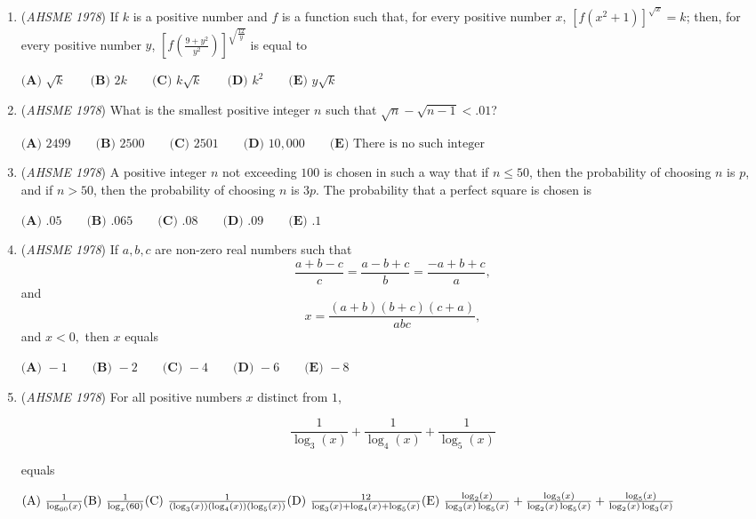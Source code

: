 \begin{enumerate}
 $\textbf{(A) }0\qquad \textbf{(B) }1\qquad \textbf{(C) }N-1\qquad \textbf{(D) }N\qquad  \textbf{(E) }\text{none of these}$


	\item (\textit{AHSME 1978}) If $k$ is a positive number and $f$ is a function such that, for every positive number $x$, $\left[f(x^2+1)\right]^{\sqrt{x}}=k$; 
then, for every positive number $y$, $\left[f(\frac{9+y^2}{y^2})\right]^{\sqrt{\frac{12}{y}}}$ is equal to


 $\textbf{(A) }\sqrt{k}\qquad \textbf{(B) }2k\qquad \textbf{(C) }k\sqrt{k}\qquad \textbf{(D) }k^2\qquad  \textbf{(E) }y\sqrt{k}$


	\item (\textit{AHSME 1978}) What is the smallest positive integer $n$ such that $\sqrt{n}-\sqrt{n-1}<.01$?


 $\textbf{(A) }2499\qquad \textbf{(B) }2500\qquad \textbf{(C) }2501\qquad \textbf{(D) }10,000\qquad  \textbf{(E) }\text{There is no such integer}$


	\item (\textit{AHSME 1978}) A positive integer $n$ not exceeding $100$ is chosen in such a way that if $n\le 50$, then the probability of choosing 
$n$ is $p$, and if $n > 50$, then the probability of choosing $n$ is $3p$. The probability that a perfect square is chosen is


 $\textbf{(A) }.05\qquad \textbf{(B) }.065\qquad \textbf{(C) }.08\qquad \textbf{(D) }.09\qquad  \textbf{(E) }.1$


	\item (\textit{AHSME 1978}) If $a,b,c$ are non-zero real numbers such that 
 \[\frac{a+b-c}{c}=\frac{a-b+c}{b}=\frac{-a+b+c}{a},\] and 
 \[x=\frac{(a+b)(b+c)(c+a)}{abc},\] and $x<0,$ then $x$ equals


 $\textbf{(A) }{-}1\qquad \textbf{(B) }{-}2\qquad \textbf{(C) }{-}4\qquad \textbf{(D) }{-}6\qquad  \textbf{(E) }{-}8$


	\item (\textit{AHSME 1978}) For all positive numbers $x$ distinct from $1$,


 
 \[\frac{1}{\log_3(x)}+\frac{1}{\log_4(x)}+\frac{1}{\log_5(x)}\]


 equals


 $\text{(A) }\frac{1}{\log_{60}(x)}\qquad\\ \text{(B) }\frac{1}{\log_{x}(60)}\qquad\\ \text{(C) }\frac{1}{(\log_{3}(x))(\log_{4}(x))(\log_{5}(x))}\qquad\\ \text{(D) }\frac{12}{\log_{3}(x)+\log_{4}(x)+\log_{5}(x)}\qquad\\ \text{(E) }\frac{\log_{2}(x)}{\log_{3}(x)\log_{5}(x)}+\frac{\log_{3}(x)}{\log_{2}(x)\log_{5}(x)}+\frac{\log_{5}(x)}{\log_{2}(x)\log_{3}(x)}$



\end{enumerate}
